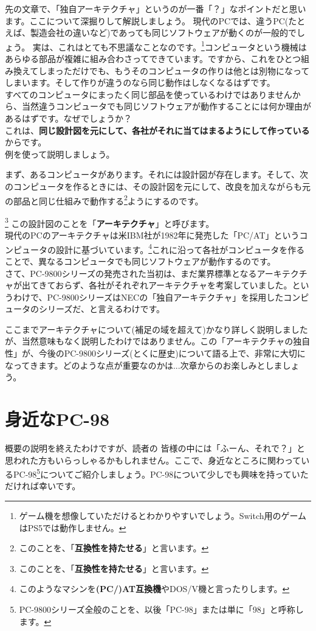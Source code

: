 \documentclass[b5paper,9pt,platex,dvipdfmx]{jsarticle}
\begin{document}
\begin{multicols}{3}
先の文章で、「独自アーキテクチャ」というのが一番「？」なポイントだと思います。ここについて深掘りして解説しましょう。
現代のPCでは、違うPC(たとえば、製造会社の違いなど)であっても同じソフトウェアが動くのが一般的でしょう。
実は、これはとても不思議なことなのです。\footnote{ゲーム機を想像していただけるとわかりやすいでしょう。Switch用のゲームはPS5では動作しません。}コンピュータという機械はあらゆる部品が複雑に組み合わさってできています。ですから、これをひとつ組み換えてしまっただけでも、もうそのコンピュータの作りは他とは別物になってしまいます。そして作りが違うのなら同じ動作はしなくなるはずです。\\
すべてのコンピュータにまったく同じ部品を使っているわけではありませんから、当然違うコンピュータでも同じソフトウェアが動作することには何か理由があるはずです。なぜでしょうか？\\
これは、{\bf 同じ設計図を元にして、各社がそれに当てはまるようにして作っている}からです。\\
例を使って説明しましょう。\\
\begin{screen}
まず、あるコンピュータがあります。それには設計図が存在します。そして、次のコンピュータを作るときには、その設計図を元にして、改良を加えながらも元の部品と同じ仕組みで動作する\footnote{このことを、「{\bf 互換性を持たせる}」と言います。}ようにするのです。
\end{screen}
\footnote{このことを、「{\bf 互換性を持たせる}」と言います。}
この設計図のことを「{\bf アーキテクチャ}」と呼びます。\\
現代のPCのアーキテクチャは米IBM社が1982年に発売した「PC/AT」というコンピュータの設計に基づいています。\footnote{このようなマシンを{\bf(PC/)AT互換機}やDOS/V機と言ったりします。}これに沿って各社がコンピュータを作ることで、異なるコンピュータでも同じソフトウェアが動作するのです。\\
さて、PC-9800シリーズの発売された当初は、まだ業界標準となるアーキテクチャが出てきておらず、各社がそれぞれアーキテクチャを考案していました。というわけで、PC-9800シリーズはNECの「独自アーキテクチャ」を採用したコンピュータのシリーズだ、と言えるわけです。

ここまでアーキテクチャについて(補足の域を超えて)かなり詳しく説明しましたが、当然意味もなく説明したわけではありません。この「アーキテクチャの独自性」が、今後のPC-9800シリーズ(とくに歴史)について語る上で、非常に大切になってきます。どのような点が重要なのかは...次章からのお楽しみとしましょう。
\part{身近なPC-98}
\setcounter{section}{0}
概要の説明を終えたわけですが、読者の 皆様の中には「ふーん、それで？」と思われた方もいらっしゃるかもしれません。ここで、身近なところに関わっているPC-98\footnote{PC-9800シリーズ全般のことを、以後「PC-98」または単に「98」と呼称します。}についてご紹介しましょう。PC-98について少しでも興味を持っていただければ幸いです。

\end{multicols}
\end{document}

